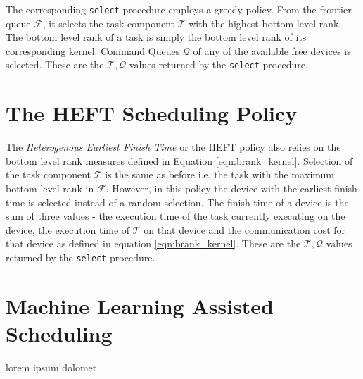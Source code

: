 


The corresponding {\tt select} procedure employs a greedy policy. From the frontier queue $\mathcal{F}$, it selects the task component $\mathcal{T}$ with the highest bottom level rank. The bottom level rank of a task is simply the bottom level rank of its corresponding kernel. Command Queues $\mathcal{Q}$ of any of the available free devices is selected. These are the  $\mathcal{T},\mathcal{Q}$ values returned by the {\tt select} procedure.


\section{The HEFT Scheduling Policy}
The \emph{Heterogenous Earliest Finish Time} \cite{heftoriginal} or the HEFT policy also relies on the bottom level rank measures defined in Equation \ref{eqn:brank_kernel}. Selection of the task component $\mathcal{T}$ is the same as before i.e. the task with the maximum bottom level rank in $\mathcal{F}$. However, in this policy the device with the earliest finish time is selected instead of a random selection. The finish time of a device is the sum of three values - the execution time of the task currently executing on the device, the execution time of $\mathcal{T}$ on that device and the communication cost for that device as defined in equation \ref{eqn:brank_kernel}. These are the  $\mathcal{T},\mathcal{Q}$ values returned by the {\tt select} procedure.

\section{Machine Learning Assisted Scheduling}
lorem ipsum dolomet

